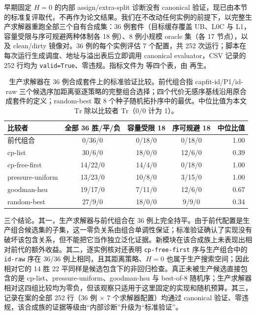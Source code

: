 早期固定 $H=0$ 的内部 assign/extra-split 诊断没有 canonical 验证，现已由本节的标准复评取代，不再作为论文结果。我们在不改动任何实例的前提下，以完整生产求解器重跑全部三个自有合成集：36 例套件（目标缓存覆盖 UB、L0C 与 L1，容量受限与序可规避两种体制各 18 例）、8 例小规模 oracle 集（各 17 节点），以及 clean/dirty 镜像对。36 例的每个实例评估 7 个配置，共 252 次运行；脚本在每次运行生成调度、地址与溢出表后立即调用 canonical evaluator，CSV 记录的 252 行均为 \texttt{valid=True}、零违规。指标文件为  等四个表，由  再生。

\begin{table}[htbp]\centering\small
\caption{生产求解器在 36 例合成套件上的标准验证比较。前代组合指 capfit-id/P1/id-raw 三个候选序加距离驱逐策略的完整组合选择；四个代价无感序基线沿用原合成套件的定义；random-best 取 8 个种子随机拓扑序中的最优。中位比值为本文 $\mathrm{Tr}$ 除以比较者 $\mathrm{Tr}$（$0/0$ 计为 1）。}
\label{tab:supp-synth-v2-suite-zh}
\begin{tabular}{lcccr}\toprule
比较者 & 全部 36 胜/平/负 & 容量受限 18 & 序可规避 18 & 中位比值\\\midrule
前代组合 & 0/36/0 & 0/18/0 & 0/18/0 & 1.00\\
cp-list & 30/6/0 & 18/0/0 & 12/6/0 & 0.39\\
cp-free-first & 14/22/0 & 14/4/0 & 0/18/0 & 1.00\\
pressure-uniform & 13/23/0 & 10/8/0 & 3/15/0 & 1.00\\
goodman-hsu & 19/17/0 & 7/11/0 & 12/6/0 & 0.67\\
random-best & 27/9/0 & 18/0/0 & 9/9/0 & 0.34\\\bottomrule
\end{tabular}\end{table}

三个结论。其一，生产求解器与前代组合在 36 例上完全持平。由于前代配置是生产组合候选集的子集，这一零负关系由组合单调性保证；标准验证确认了实现没有破坏该包含关系，但不能把它当作独立泛化证据。新模块在该合成族上未表现出相对前代的额外收益。其二，逐实例核对还表明 \texttt{cp-free-first} 序与生产组合中的 \texttt{id-raw} 序在 36/36 例上相同，且其距离策略、$H=0$ 也属于生产搜索空间；因此相对它的 14 胜 22 平同样是候选包含下的非回归检查。真正未被生产候选直接包含的是 cp-list、pressure-uniform、goodman-hsu 与 best-of-8 随机序；生产求解器相对这四组比较均为零负，但该观察只适用于这里固定的实现和随机预算。其三，记录在案的全部 252 行（36 例 $\times$ 7 个求解器配置）均通过 canonical 验证、零违规，该合成族的证据等级由“内部诊断”升级为“标准验证”。

